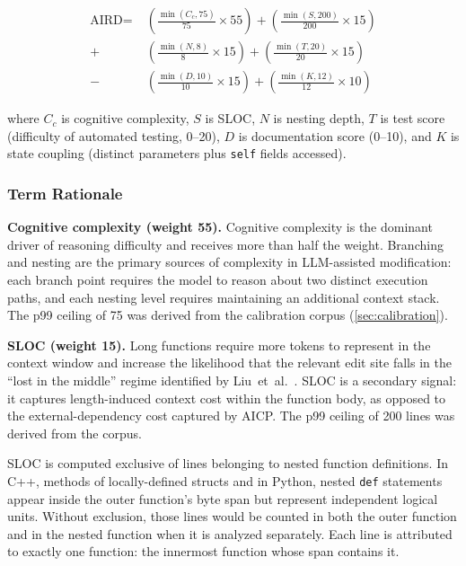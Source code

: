 \documentclass[10pt,twocolumn,letterpaper]{article}
\begin{document}
\begin{align}
\text{AIRD} = &\;\left(\frac{\min(C_c, 75)}{75} \times 55\right)
             + \left(\frac{\min(S, 200)}{200} \times 15\right) \nonumber \\
             + &\;\left(\frac{\min(N, 8)}{8} \times 15\right)
             + \left(\frac{\min(T, 20)}{20} \times 15\right) \nonumber \\
             - &\;\left(\frac{\min(D, 10)}{10} \times 15\right)
             + \left(\frac{\min(K, 12)}{12} \times 10\right)
\label{eq:aird}
\end{align}

where $C_c$ is cognitive complexity, $S$ is SLOC, $N$ is nesting depth,
$T$ is test score (difficulty of automated testing, 0--20), $D$ is
documentation score (0--10), and $K$ is state coupling (distinct
parameters plus \texttt{self} fields accessed).

\subsubsection{Term Rationale}

\textbf{Cognitive complexity (weight 55).}  Cognitive complexity is the
dominant driver of reasoning difficulty and receives more than half the
weight.  Branching and nesting are the primary sources of complexity in
LLM-assisted modification: each branch point requires the model to
reason about two distinct execution paths, and each nesting level
requires maintaining an additional context stack.  The p99 ceiling of 75
was derived from the calibration corpus (\cref{sec:calibration}).

\textbf{SLOC (weight 15).}  Long functions require more tokens to
represent in the context window and increase the likelihood that the
relevant edit site falls in the ``lost in the middle'' regime identified
by Liu~et~al.~\cite{liu-lost}.  SLOC is a secondary signal: it captures
length-induced context cost within the function body, as opposed to the
external-dependency cost captured by AICP.  The p99 ceiling of 200
lines was derived from the corpus.

SLOC is computed exclusive of lines belonging to nested function
definitions.  In C++, methods of locally-defined structs and in Python,
nested \texttt{def} statements appear inside the outer function's byte
span but represent independent logical units.  Without exclusion, those
lines would be counted in both the outer function and in the nested
function when it is analyzed separately.  Each line is attributed to
exactly one function: the innermost function whose span contains it.
\end{document}
